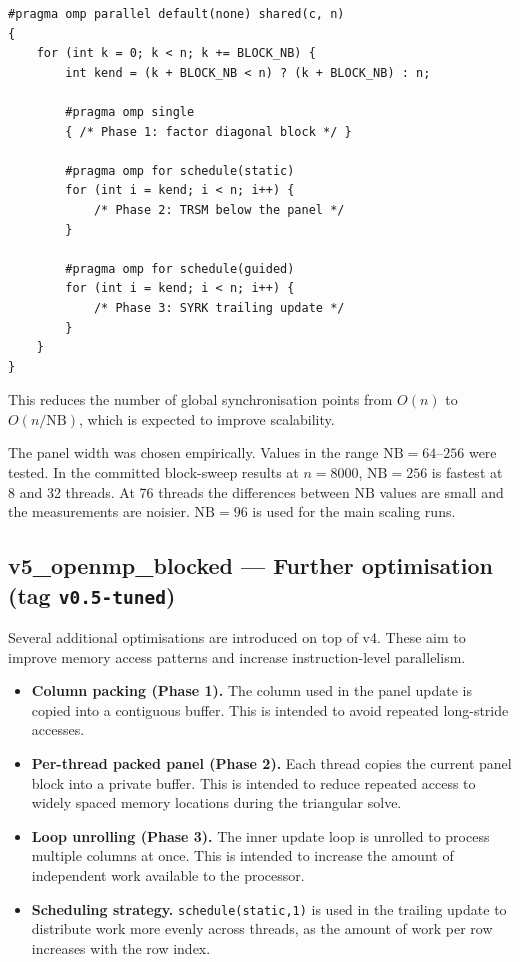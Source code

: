 \documentclass{article}
\begin{document}
\begin{lstlisting}[style=code,caption={Panel-blocked structure in v4.},label={lst:v4}]
#pragma omp parallel default(none) shared(c, n)
{
    for (int k = 0; k < n; k += BLOCK_NB) {
        int kend = (k + BLOCK_NB < n) ? (k + BLOCK_NB) : n;

        #pragma omp single
        { /* Phase 1: factor diagonal block */ }

        #pragma omp for schedule(static)
        for (int i = kend; i < n; i++) {
            /* Phase 2: TRSM below the panel */
        }

        #pragma omp for schedule(guided)
        for (int i = kend; i < n; i++) {
            /* Phase 3: SYRK trailing update */
        }
    }
}
\end{lstlisting}

This reduces the number of global synchronisation points from $O(n)$ to
$O(n/\mathrm{NB})$, which is expected to improve scalability.

The panel width was chosen empirically. Values in the range
$\mathrm{NB}=64$--$256$ were tested. In the committed block-sweep results at
$n=8000$, $\mathrm{NB}=256$ is fastest at 8 and 32 threads.
At 76 threads the differences between $\mathrm{NB}$ values are small and
the measurements are noisier. $\mathrm{NB}=96$ is used for
the main scaling runs.

\subsection{v5\_openmp\_blocked --- Further optimisation (tag \texttt{v0.5-tuned})}

Several additional optimisations are introduced on top of v4. These aim to
improve memory access patterns and increase instruction-level parallelism.

\begin{itemize}
  \item \textbf{Column packing (Phase 1).}
  The column used in the panel update is copied into a contiguous buffer.
  This is intended to avoid repeated long-stride accesses.

  \item \textbf{Per-thread packed panel (Phase 2).}
  Each thread copies the current panel block into a private buffer.
  This is intended to reduce repeated access to widely spaced memory
  locations during the triangular solve.

  \item \textbf{Loop unrolling (Phase 3).}
  The inner update loop is unrolled to process multiple columns at once.
  This is intended to increase the amount of independent work available
  to the processor.

  \item \textbf{Scheduling strategy.}
  \texttt{schedule(static,1)} is used in the trailing update to distribute
  work more evenly across threads, as the amount of work per row increases
  with the row index.
\end{itemize}
\end{document}
